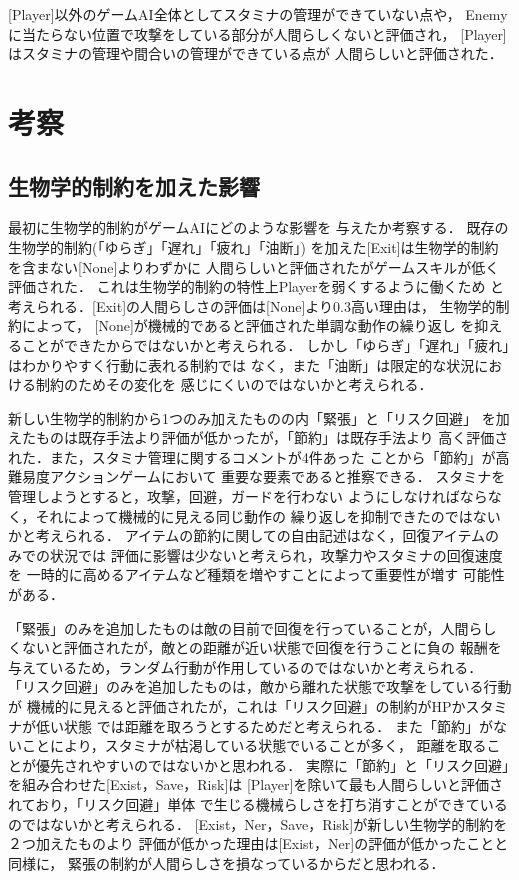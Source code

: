 \documentclass[a4paper,12pt,oneside,openany,titlepage]{jreport}
\begin{document}
 [Player]以外のゲームAI全体としてスタミナの管理ができていない点や，
 Enemyに当たらない位置で攻撃をしている部分が人間らしくないと評価され，
 [Player]はスタミナの管理や間合いの管理ができている点が
 人間らしいと評価された．


\chapter{考察}
\thispagestyle{fancy}
\lhead{\leftmark}
\rhead{\thepage}
\renewcommand{\headrulewidth}{1pt}

\section{生物学的制約を加えた影響}
最初に生物学的制約がゲームAIにどのような影響を
与えたか考察する．
既存の生物学的制約(「ゆらぎ」「遅れ」「疲れ」「油断」)
を加えた[Exit]は生物学的制約を含まない[None]よりわずかに
人間らしいと評価されたがゲームスキルが低く評価された．
これは生物学的制約の特性上Playerを弱くするように働くため
と考えられる．[Exit]の人間らしさの評価は[None]より0.3高い理由は，
生物学的制約によって，
[None]が機械的であると評価された単調な動作の繰り返し
を抑えることができたからではないかと考えられる．
しかし「ゆらぎ」「遅れ」「疲れ」はわかりやすく行動に表れる制約では
なく，また「油断」は限定的な状況における制約のためその変化を
感じにくいのではないかと考えられる．

新しい生物学的制約から1つのみ加えたものの内「緊張」と「リスク回避」
を加えたものは既存手法より評価が低かったが，「節約」は既存手法より
高く評価された．また，スタミナ管理に関するコメントが4件あった
ことから「節約」が高難易度アクションゲームにおいて
重要な要素であると推察できる．
スタミナを管理しようとすると，攻撃，回避，ガードを行わない
ようにしなければならなく，それによって機械的に見える同じ動作の
繰り返しを抑制できたのではないかと考えられる．
アイテムの節約に関しての自由記述はなく，回復アイテムのみでの状況では
評価に影響は少ないと考えられ，攻撃力やスタミナの回復速度を
一時的に高めるアイテムなど種類を増やすことによって重要性が増す
可能性がある．

「緊張」のみを追加したものは敵の目前で回復を行っていることが，人間らし
くないと評価されたが，敵との距離が近い状態で回復を行うことに負の
報酬を与えているため，ランダム行動が作用しているのではないかと考えられる．
「リスク回避」のみを追加したものは，敵から離れた状態で攻撃をしている行動が
機械的に見えると評価されたが，これは「リスク回避」の制約がHPかスタミナが低い状態
では距離を取ろうとするためだと考えられる．
また「節約」がないことにより，スタミナが枯渇している状態でいることが多く，
距離を取ることが優先されやすいのではないかと思われる．
実際に「節約」と「リスク回避」を組み合わせた[Exist，Save，Risk]は
[Player]を除いて最も人間らしいと評価されており，「リスク回避」単体
で生じる機械らしさを打ち消すことができているのではないかと考えられる．
[Exist，Ner，Save，Risk]が新しい生物学的制約を２つ加えたものより
評価が低かった理由は[Exist，Ner]の評価が低かったことと同様に，
緊張の制約が人間らしさを損なっているからだと思われる．
\end{document}
